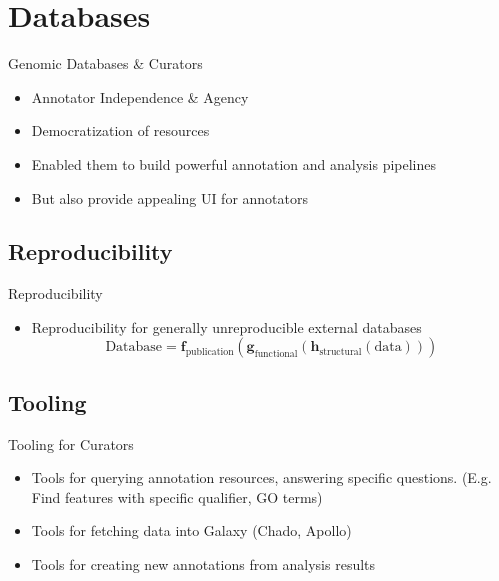 \documentclass[12pt]{phage3slides} %
\begin{document}
\section{Databases}

\begin{frame}{Genomic Databases \& Curators}
    \begin{itemize}
        \item Annotator Independence \& Agency
        \item Democratization of resources%
        \item Enabled them to build powerful annotation and analysis pipelines
        \item But also provide appealing UI for annotators
    \end{itemize}
\end{frame}

\subsection{Reproducibility}
\begin{frame}{Reproducibility}
    \begin{itemize}
        \item Reproducibility for generally unreproducible external databases\\
            \begin{equation*}
                \text{Database} = %
                    \textbf{f}_{\text{publication}}(%
                    \textbf{g}_{\text{functional}}(%
                    \textbf{h}_{\text{structural}}(%
                    \text{data}%
                    )))
            \end{equation*}
    \end{itemize}
\end{frame}

\subsection{Tooling}
\begin{frame}{Tooling for Curators}
    \begin{itemize}
        \item Tools for querying annotation resources, answering specific questions. (E.g. Find features with specific qualifier, GO terms)
        \item Tools for fetching data into Galaxy (Chado, Apollo)
        \item Tools for creating new annotations from analysis results
    \end{itemize}
\end{frame}
\end{document}
